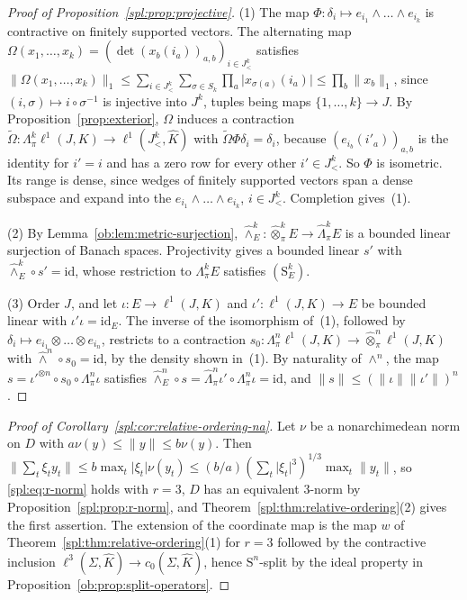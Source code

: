 \documentclass[11pt]{amsart}
\theoremstyle{definition}
\theoremstyle{remark}
\numberwithin{equation}{section}
\newcommand{\id}{\mathrm{id}}
\newcommand{\abs}[1]{\lvert #1\rvert}
\newcommand{\norm}[1]{\lVert #1\rVert}
\theoremstyle{plain}
\theoremstyle{definition}
\theoremstyle{plain}
\begin{document}
\begin{proof}[Proof of Proposition~\ref{spl:prop:projective}]
(1) The map $\Phi\colon\delta_i\mapsto e_{i_1}\wedge\dots\wedge e_{i_k}$ is contractive on finitely supported vectors.
The alternating map $\Omega(x_1,\dots,x_k)=(\det(x_b(i_a))_{a,b})_{i\in J^k_<}$ satisfies
$\norm{\Omega(x_1,\dots,x_k)}_1\le\sum_{i\in J^k_<}\sum_{\sigma\in S_k}\prod_a\abs{x_{\sigma(a)}(i_a)}\le\prod_b\norm{x_b}_1$,
since $(i,\sigma)\mapsto i\circ\sigma^{-1}$ is injective into $J^k$, tuples being maps $\{1,\dots,k\}\to J$. By
Proposition~\ref{prop:exterior}, $\Omega$ induces a contraction
$\widetilde\Omega\colon\Lambda^k_\pi\ell^1(J,K)\to\ell^1(J^k_<,\widehat K)$ with $\widetilde\Omega\Phi\delta_i=\delta_i$,
because $(e_{i_b}(i'_a))_{a,b}$ is the identity for $i'=i$ and has a zero row for every other $i'\in J^k_<$. So $\Phi$ is
isometric. Its range is dense, since wedges of finitely supported vectors span a dense subspace and expand into the
$e_{i_1}\wedge\dots\wedge e_{i_k}$, $i\in J^k_<$. Completion gives~(1).

(2) By Lemma~\ref{ob:lem:metric-surjection}, $\widehat\wedge^k_E\colon\widehat\otimes^k_\pi E\to\widehat\Lambda^k_\pi E$
is a bounded linear surjection of Banach spaces. Projectivity gives a bounded linear $s'$ with
$\widehat\wedge^k_E\circ s'=\id$, whose restriction to $\Lambda^k_\pi E$ satisfies $(\mathrm S^k_E)$.

(3) Order $J$, and let $\iota\colon E\to\ell^1(J,K)$ and $\iota'\colon\ell^1(J,K)\to E$ be bounded linear with
$\iota'\iota=\id_E$. The inverse of the isomorphism of~(1), followed by $\delta_i\mapsto e_{i_1}\otimes\dots\otimes
e_{i_n}$, restricts to a contraction $s_0\colon\Lambda^n_\pi\ell^1(J,K)\to\widehat\otimes^n_\pi\ell^1(J,K)$ with
$\widehat\wedge^n\circ s_0=\id$, by the density shown in~(1). By naturality of $\wedge^n$, the map
$s=\iota'^{\otimes n}\circ s_0\circ\Lambda^n_\pi\iota$ satisfies $\widehat\wedge^n_E\circ s=\widehat\Lambda^n_\pi\iota'
\circ\Lambda^n_\pi\iota=\id$, and $\norm s\le(\norm\iota\norm{\iota'})^n$.
\end{proof}

\begin{proof}[Proof of Corollary~\ref{spl:cor:relative-ordering-na}]
Let $\nu$ be a nonarchimedean norm on $D$ with $a\nu(y)\le\norm y\le b\nu(y)$. Then
$\norm{\sum_t\xi_ty_t}\le b\max_t\abs{\xi_t}\nu(y_t)\le(b/a)(\sum_t\abs{\xi_t}^3)^{1/3}\max_t\norm{y_t}$, so
\eqref{spl:eq:r-norm} holds with $r=3$, $D$ has an equivalent $3$-norm by Proposition~\ref{spl:prop:r-norm}, and
Theorem~\ref{spl:thm:relative-ordering}(2) gives the first assertion. The extension of the coordinate map is the map $w$ of
Theorem~\ref{spl:thm:relative-ordering}(1) for $r=3$ followed by the contractive inclusion
$\ell^3(\Sigma,\widehat K)\to c_0(\Sigma,\widehat K)$, hence $\mathrm S^n$-split by the ideal property in
Proposition~\ref{ob:prop:split-operators}.
\end{proof}
\end{document}
